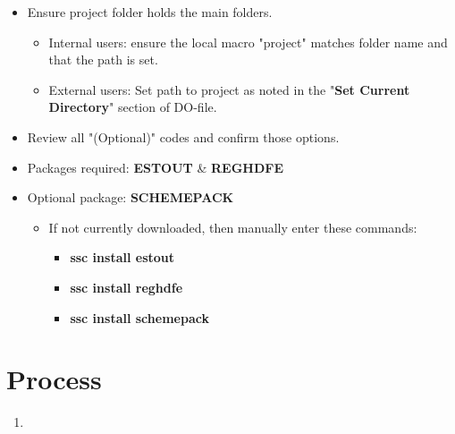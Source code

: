 \documentclass[12pt]{article}
\begin{document}
\begin{itemize}
\begin{itemize}
\item Ensure project folder holds the main folders.
\begin{itemize}
\item Internal users: ensure the local macro "project" matches folder name and that the path is set.
\item External users: Set path to project as noted in the "\textbf{Set Current Directory}" section of DO-file.
\end{itemize}

\item Review all "(Optional)" codes and confirm those options.
\item Packages required: \textbf{ESTOUT} \& \textbf{REGHDFE} 
\item Optional package: \textbf{SCHEMEPACK}

\begin{itemize}
\item If not currently downloaded, then manually enter these commands:
\begin{itemize}
\item \textbf{ssc install estout}
\item \textbf{ssc install reghdfe}
\item \textbf{ssc install schemepack}
\end{itemize}

\end{itemize}
\end{itemize}
\end{itemize}

\section{Process}

\begin{enumerate}
\item 

\end{enumerate}
\end{document}
